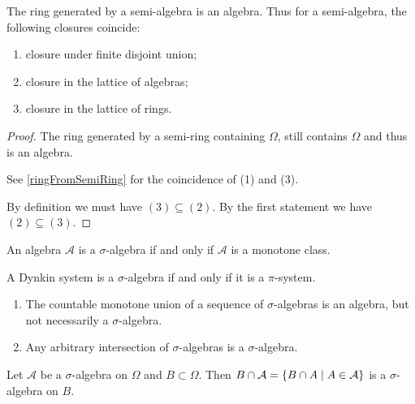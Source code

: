 \begin{lemma} \label{algebraFromSemiAlgebra}
The ring generated by a semi-algebra is an algebra. Thus for a semi-algebra, the following closures coincide:
\begin{enumerate}
\item closure under finite disjoint union;
\item closure in the lattice of algebras;
\item closure in the lattice of rings.
\end{enumerate}
\end{lemma}
\begin{proof}
The ring generated by a semi-ring containing $\Omega$, still contains $\Omega$ and thus is an algebra.

See \ref{ringFromSemiRing} for the coincidence of (1) and (3).

By definition we must have $(3) \subseteq (2)$. By the first statement we have $(2) \subseteq (3)$.
\end{proof}

\begin{lemma} \label{algebraMonotoneClass}
An algebra $\mathcal{A}$ is a $\sigma$-algebra \textup{if and only if} $\mathcal{A}$ is a monotone class.
\end{lemma}
\begin{lemma} \label{DynkinPiSystem}
A Dynkin system is a $\sigma$-algebra \textup{if and only if} it is a $\pi$-system.
\end{lemma}


\begin{lemma}
\begin{enumerate}
\item The countable monotone union of a sequence of $\sigma$-algebras is an algebra, but not necessarily a $\sigma$-algebra.
\item Any arbitrary intersection of $\sigma$-algebras is a $\sigma$-algebra.
\end{enumerate}
\end{lemma}

\begin{lemma}
Let $\mathcal{A}$ be a $\sigma$-algebra on $\Omega$ and $B\subset \Omega$. Then $B\cap \mathcal{A} = \setbuilder{B\cap A}{A\in\mathcal{A}}$ is a $\sigma$-algebra on $B$.
\end{lemma}

